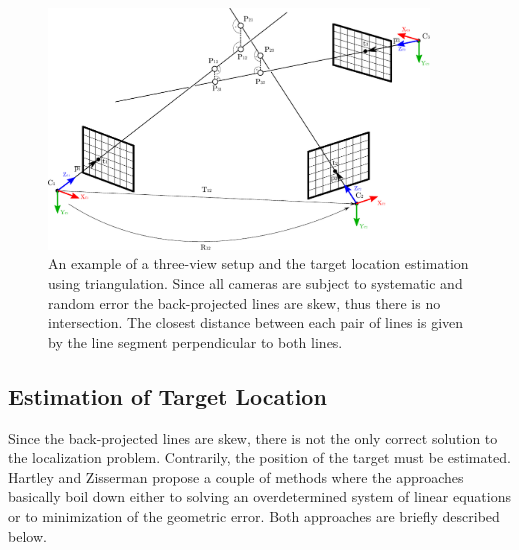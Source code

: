 \begin{figure}[tbh]
	\centering
	\includegraphics[width=0.9\textwidth]{fig/multi_view_intersection.pdf}
	\caption{An example of a three-view setup and the target location estimation using triangulation. Since all cameras are subject to systematic and random error the back-projected lines are skew, thus there is no intersection. The closest distance between each pair of lines is given by the line segment perpendicular to both lines.}
	\label{fig:multi_view_intersection}
\end{figure}

\subsection{Estimation of Target Location} \label{txt:estimation_of_target_location}

Since the back-projected lines are skew, there is not the only correct solution to the localization problem. Contrarily, the position of the target must be estimated. Hartley and Zisserman \cite{Hartley:2003:MVG:861369} propose a couple of methods where the approaches basically boil down either to solving an overdetermined system of linear equations or to minimization of the geometric error. Both approaches are briefly described below.

